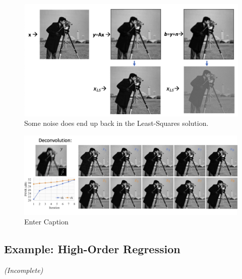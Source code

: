 \begin{figure}[H]
    \centering
    \includegraphics[width=0.75\linewidth]{img/ls-deconv.png}
    \caption{Some noise does end up back in the Least-Squares solution.}
    
\end{figure}
\begin{figure}[H]
    \centering
    \includegraphics[width=1\linewidth]{img/deconv2.png}
    \caption{Enter Caption}
\end{figure}
\subsection{Example: High-Order Regression}
\textit{(Incomplete)}
